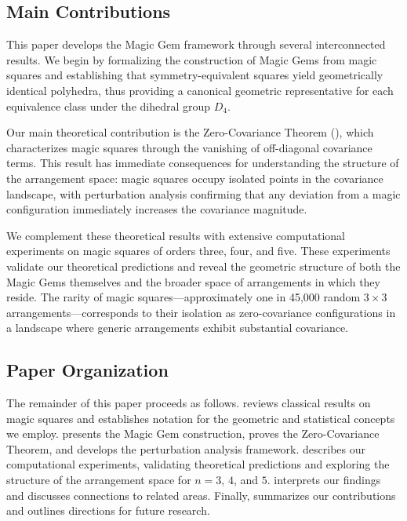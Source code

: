 \subsection{Main Contributions}

This paper develops the Magic Gem framework through several interconnected results.
We begin by formalizing the construction of Magic Gems from magic squares
and establishing that symmetry-equivalent squares yield geometrically identical polyhedra,
thus providing a canonical geometric representative for each equivalence class under the dihedral group $D_4$.

Our main theoretical contribution is the Zero-Covariance Theorem (), 
which characterizes magic squares through the vanishing of off-diagonal covariance terms.
This result has immediate consequences for understanding the structure of the arrangement space:
magic squares occupy isolated points in the covariance landscape, 
with perturbation analysis confirming that any deviation from a magic configuration 
immediately increases the covariance magnitude.

We complement these theoretical results with extensive computational experiments on magic squares 
of orders three, four, and five.
These experiments validate our theoretical predictions and reveal the geometric structure 
of both the Magic Gems themselves and the broader space of arrangements in which they reside.
The rarity of magic squares---approximately one in 45,000 random $3 \times 3$ arrangements---corresponds 
to their isolation as zero-covariance configurations in a landscape where generic arrangements 
exhibit substantial covariance.

\subsection{Paper Organization}

The remainder of this paper proceeds as follows.
 reviews classical results on magic squares and establishes notation 
for the geometric and statistical concepts we employ.
 presents the Magic Gem construction, proves the Zero-Covariance Theorem,
and develops the perturbation analysis framework.
 describes our computational experiments, validating theoretical predictions 
and exploring the structure of the arrangement space for $n = 3$, $4$, and $5$.
 interprets our findings and discusses connections to related areas.
Finally,  summarizes our contributions and outlines directions for future research.
